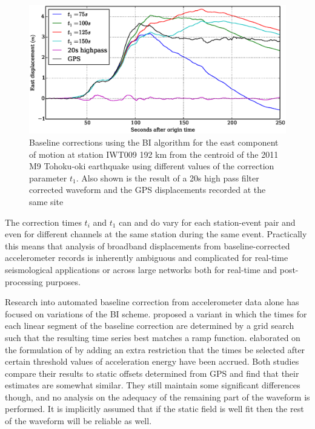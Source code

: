 \begin{figure}[!ht] 
  \centering
  \includegraphics[width=0.99\linewidth]{./figures/iwt009bl.eps}
    \caption[Some simple baseline corrections.]{Baseline corrections using the BI algorithm for the east component of motion at station IWT009 192 km from the centroid of the 2011 M9 Tohoku-oki earthquake using different values of the correction parameter $t_1$. Also shown is the result of a 20s high pass filter corrected waveform and the GPS displacements recorded at the same site}
  \label{fig_iwt009bl}
\end{figure}

The correction times $t_i$ and $t_1$ can and do vary for each station-event pair and even for different channels at the same station during the same event. Practically this means that analysis of broadband displacements from baseline-corrected accelerometer records is inherently ambiguous and complicated for real-time seismological applications or across large networks both for real-time and post-processing purposes.

Research into automated baseline correction from accelerometer data alone has focused on variations of the BI scheme. \citet{Wu2007} proposed a variant in which the times for each linear segment of the baseline correction are determined by a grid search such that the resulting time series best matches a ramp function. \citet{Chao2010} elaborated on the formulation of \citet{2007} by adding an extra restriction that the times be selected after certain threshold values of acceleration energy have been accrued. Both studies compare their results to static offsets determined from GPS and find that their estimates are somewhat similar. They still maintain some significant differences though, and no analysis on the adequacy of the remaining part of the waveform is performed. It is implicitly assumed that if the static field is well fit then the rest of the waveform will be reliable as well.

